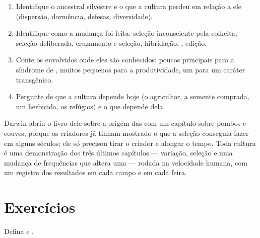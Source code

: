 \begin{method}\label{met:g12:domesticated-plants:read}
\begin{enumerate}
  \item Identifique o ancestral silvestre e o que a cultura perdeu em
        relação a ele (dispersão, dormência, defesas, diversidade).
  \item Identifique como a mudança foi feita: seleção inconsciente pela
        colheita, seleção deliberada, cruzamento e seleção, hibridação,
        , edição.
  \item Conte os  envolvidos onde eles são conhecidos: poucos
         principais para a síndrome de , muitos 
        pequenos para a produtividade, um para um caráter transgênico.
  \item Pergunte de que a cultura depende hoje (o agricultor, a semente
        comprada, um herbicida, os refúgios) e o que depende dela.
\end{enumerate}
\end{method}

\begin{remark}\label{rem:g12:domesticated-plants:oldest}
Darwin abriu o livro dele sobre a origem das  com um capítulo
sobre pombos e couves, porque os criadores já tinham mostrado o que a
seleção conseguia fazer em alguns séculos; ele só precisou tirar o
criador e alongar o tempo. Toda cultura é uma demonstração dos três
últimos capítulos --- variação, seleção e uma mudança de frequências
que altera uma  --- rodada na velocidade humana, com um registro
dos resultados em cada campo e em cada feira.
\end{remark}

\section{Exercícios}

\begin{exercise}[$\star$]\label{exo:g12:domesticated-plants:1}
Defina  e .
\end{exercise}

